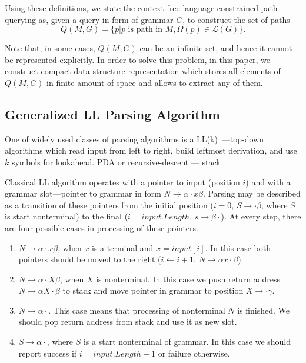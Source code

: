 Using these definitions, we state the context-free language constrained path querying as, given a query in form of grammar $G$, to construct the set of paths $$Q(M,G)=\{p|p \text{ is path in } M, \Omega(p) \in \mathcal{L}(G)\}.$$

Note that, in some cases, $Q(M,G)$ can be an infinite set, and hence it cannot be represented explicitly. 
In order to solve this problem, in this paper, we construct compact data structure representation which stores all elements of $Q(M,G)$ in finite amount of space and allows to extract any of them.

\subsection{Generalized LL Parsing Algorithm}\label{BasicGLL}

One of widely used classes of parsing algorithms is a LL(k)~\cite{Grune}---top-down algorithms which read input from left to right, build leftmost derivation, and use $k$ symbols for lookahead.
PDA or recursive-descent --- stack

Classical LL algorithm operates with a pointer to input (position $i$) and with a grammar slot---pointer to grammar in form $N \rightarrow \alpha \cdot x \beta $.
Parsing may be described as a transition of these pointers from the initial position ($i = 0$, $S \rightarrow \cdot \beta $, where $S$ is start nonterminal) to the final ($i = input.Length$, $s \rightarrow \beta \cdot$).
At every step, there are four possible cases in processing of these pointers. 

\begin{enumerate}
\item $N \rightarrow \alpha \cdot x \beta $, when $x$ is a terminal and $x = input[i]$. In this case both pointers should be moved to the right ($i \leftarrow i + 1$, $N \rightarrow \alpha  x \cdot \beta $).
\item $N \rightarrow \alpha \cdot X \beta $, when $X$ is nonterminal. In this case we push return address $N \rightarrow \alpha X \cdot \beta $ to stack and move pointer in grammar to position $X \rightarrow \cdot \gamma$.\label{itm:2}
\item $N \rightarrow \alpha \cdot $. This case means that processing of nonterminal $N$ is finished. We should pop return address from stack and use it as new slot.\label{itm:3}
\item $S \rightarrow \alpha \cdot $, where $S$ is a start nonterminal of grammar. In this case we should report success if $i = input.Length - 1$ or failure otherwise. 
\end{enumerate}


